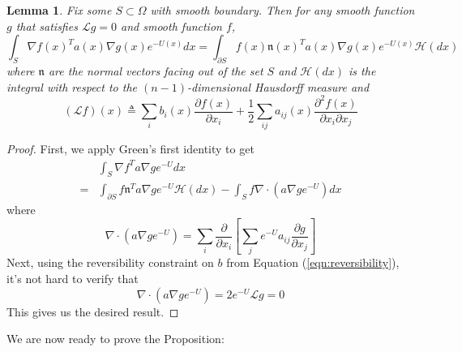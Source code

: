 \documentclass[nofootinbib,english, aip, jcp, priprint, graphicx,floatfix]{revtex4-1}
\newtheorem{lemma}{Lemma}
\theoremstyle{plain}
\theoremstyle{definition}
\theoremstyle{plain}
\newcommand{\normal}{{\mathfrak{n}}}
\newcommand{\hausdorffmeasure}{\mathscr{H}(dx)}
\begin{document}
\begin{lemma}  \label{lem:greenident}Fix some $S \subset \Omega$ with smooth boundary.  Then for any smooth function $g$ that satisfies $\mathcal{L}g = 0$ and smooth function $f$,
\begin{equation*}
\int_{S} \nabla f(x)^T a(x) \nabla g(x) e^{-U(x)}dx = \int_{\partial S} f(x) \normal(x)^T a(x) \nabla g(x) e^{-U(x)}\hausdorffmeasure
\end{equation*}
where $\normal$ are the normal vectors facing out of the set $S$ and $\hausdorffmeasure$ is the integral with respect to the $(n-1)$-dimensional Hausdorff measure and 
\[
(\mathcal{L}f)(x) \triangleq \sum_i b_i(x) \frac{\partial f (x)}{\partial x_i} + 
    \frac{1}{2} \sum_{ij}a_{ij}(x)\frac{\partial^2 f(x)}{\partial x_i \partial x_j} 
\]
\end{lemma}
\begin{proof}
First, we apply Green's first identity to get
\begin{align*}
	 &\int_{S} \nabla f^T a \nabla g e^{-U} dx\\
	=&\int_{\partial S}f \normal^T a \nabla g e^{-U} \hausdorffmeasure - \int_{S} f \nabla \cdot (a \nabla g e^{-U}) dx
\end{align*}
where
\begin{equation*}
	\nabla \cdot (a \nabla g e^{-U}) = \sum_{i}\frac{\partial}{\partial x_i}\left[\sum_{j}e^{-U}a_{i j}\frac{\partial g}{\partial x_j}\right]
\end{equation*}
Next, using the reversibility constraint on $b$ from Equation (\ref{eqn:reversibility}), it's not hard to verify that 
\begin{equation*}
	\nabla \cdot (a \nabla g e^{-U}) = 2e^{-U}\mathcal{L} g = 0
\end{equation*}
This gives us the desired result.
\end{proof}

We are now ready to prove the Proposition:
\end{document}
